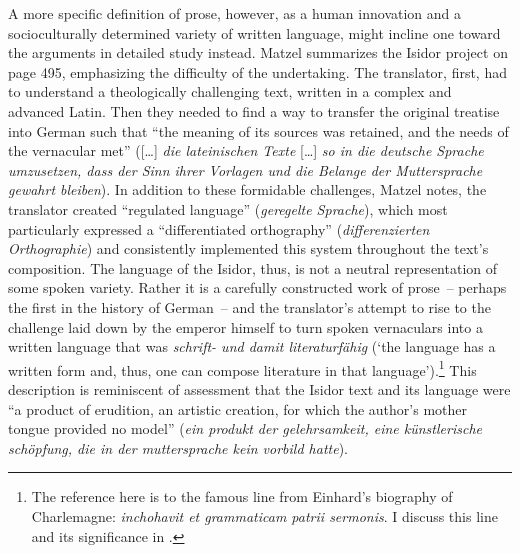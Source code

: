 A more specific definition of prose, however, as a human innovation and a socioculturally determined variety of written language, might incline one toward the arguments in  detailed study instead. Matzel summarizes the Isidor project on page 495, emphasizing the difficulty of the undertaking. The translator, first, had to understand a theologically challenging text, written in a complex and advanced Latin. Then they needed to find a way to transfer the original treatise into German such that “the meaning of its sources was retained, and the needs of the vernacular met” ([…] \textit{die lateinischen Texte} […] \textit{so in die deutsche Sprache umzusetzen, dass der Sinn ihrer Vorlagen und die Belange der Muttersprache gewahrt bleiben}). In addition to these formidable challenges, Matzel notes, the translator created “regulated language” (\textit{geregelte Sprache}), which most particularly expressed a “differentiated orthography” (\textit{differenzierten Orthographie}) and consistently implemented this system throughout the text’s composition. The language of the Isidor, thus, is not a neutral representation of some spoken variety. Rather it is a carefully constructed work of prose~-- perhaps the first in the history of German~-- and the translator’s attempt to rise to the challenge laid down by the emperor himself to turn spoken vernaculars into a written language that was \textit{schrift- und damit literaturfähig} (‘the language has a written form and, thus, one can compose literature in that language’).\footnote{{The reference here is to the famous line from Einhard’s biography of Charlemagne: \textit{inchohavit et grammaticam patrii sermonis}. I discuss this line and its significance in .}} This description is reminiscent of  assessment that the Isidor text and its language were “a product of erudition, an artistic creation, for which the author’s mother tongue provided no model” (\textit{ein produkt der gelehrsamkeit, eine künstlerische schöpfung, die in der muttersprache kein vorbild hatte}).

